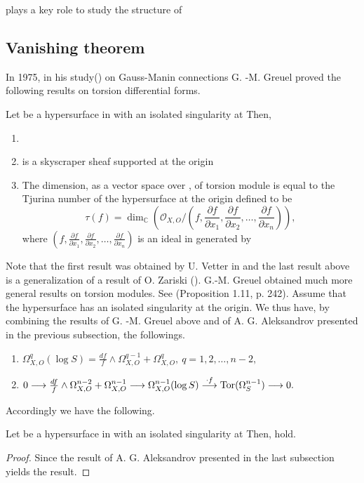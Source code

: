 \documentclass{arxsigma}
\begin{document}
plays a key role to study the structure of  
\subsection{Vanishing theorem}
In 1975, in his study(\cite{G}) on Gauss-Manin connections G. -M. Greuel proved the following results on torsion differential forms.
\begin{theorem}
Let   be a hypersurface in  
with an isolated singularity at  
Then,
\begin{enumerate}
\item
 
\item
  is a skyscraper sheaf supported at the origin  
\item
The dimension, as a vector space over  , of torsion module
  is equal to   the Tjurina number of the hypersurface   at the origin defined to be
\begin{equation*}
\tau(f) = \dim_{{\mathbb C}}\left({\mathcal O}_{X, O}/\left(f, \frac{\partial f}{\partial x_1}, \frac{\partial f}{\partial x_2},\ldots,\frac{\partial f}{\partial x_n}\right)\right),
\end{equation*}
where
$ (f, \frac{\partial f}{\partial x_1}, \frac{\partial f}{\partial x_2},\ldots,
\frac{\partial f}{\partial x_n}) $
is an ideal in   generated by \\  
\end{enumerate}
\end{theorem}
Note that the first result was obtained by U. Vetter in \cite{V} and the last result above is a generalization of a result of O. Zariski (\cite{Z}).
G.-M. Greuel obtained
much more general results on torsion modules. See \cite{G} (Proposition 1.11, p. 242).
Assume that the hypersurface   has an isolated singularity at the origin.
We thus have, by combining the results of G. -M. Greuel above and of A. G. Aleksandrov presented in the previous subsection, the followings.
\begin{enumerate}
\item $\Omega_{X,O}^{q}(\log S)= \frac{df}{f} \wedge \Omega_{X,O}^{q-1}+\Omega_{X,O}^{q},
\ q=1,2,\ldots, n-2, $
\item $
0 \longrightarrow\frac{df}{f} \wedge \Omega_{X,O}^{n-2} +
\Omega_{X,O}^{n-1}\longrightarrow
\Omega_{X,O}^{n-1}(\log S) \stackrel{\cdot f}\longrightarrow{\rm Tor}(\Omega_{S}^{n-1}) \longrightarrow 0. $
\end{enumerate}
Accordingly we have the following.
\begin{proposition} Let
  be a hypersurface in  
with an isolated singularity at   Then,
  hold.
\end{proposition}
\begin{proof}
Since  
the result of A. G. Aleksandrov presented in the last subsection yields the result.
\end{proof}
\end{document}

